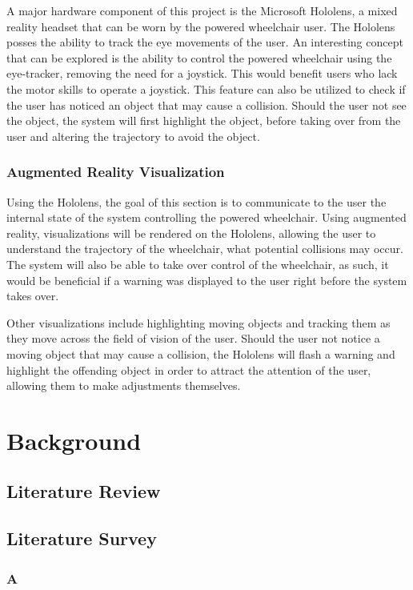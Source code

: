 \documentclass[12pt,a4paper]{report}
\begin{document}
A major hardware component of this project is the Microsoft Hololens, a mixed reality headset that can be worn by the powered wheelchair user. The Hololens posses the ability to track the eye movements of the user. An interesting concept that can be explored is the ability to control the powered wheelchair using the eye-tracker, removing the need for a joystick. This would benefit users who lack the motor skills to operate a joystick. This feature can also be utilized to check if the user has noticed an object that may cause a collision. Should the user not see the object, the system will first highlight the object, before taking over from the user and altering the trajectory to avoid the object.

\subsection{Augmented Reality Visualization}
Using the Hololens, the goal of this section is to communicate to the user the internal state of the system controlling the powered wheelchair. Using augmented reality, visualizations will be rendered on the Hololens, allowing the user to understand the trajectory of the wheelchair, what potential collisions may occur. The system will also be able to take over control of the wheelchair, as such, it would be beneficial if a warning was displayed to the user right before the system takes over.

Other visualizations include highlighting moving objects and tracking them as they move across the field of vision of the user. Should the user not notice a moving object that may cause a collision, the Hololens will flash a warning and highlight the offending object in order to attract the attention of the user, allowing them to make adjustments themselves.

\newpage

\chapter{Background}
\section{Literature Review}


\newpage
\section{Literature Survey}
\subsection{A}
\newpage
\end{document}
